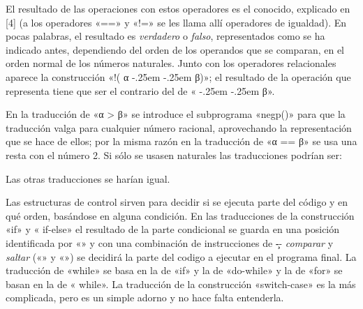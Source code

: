 El resultado de las operaciones con estos operadores es el conocido, explicado en [4] (a los
operadores «==» y «!=» se les llama allí operadores de igualdad). En pocas palabras, el resultado es
{\it verdadero} o {\it falso}, representados como se ha indicado antes, dependiendo del orden de los
operandos que se comparan, en el orden normal de los números naturales. Junto con los operadores
relacionales aparece la construcción «{\fcode!({\fgramatnoterm
α} \kern-.25em  \kern-.25em {\fgramatnoterm β})}»; el resultado de la operación
que representa tiene que ser el contrario del de «{ \kern-.25em  \kern-.25em {\fgramatnoterm β}}».

En la traducción de «{\fgramatnoterm α {\fcode >} \fgramatnoterm β}» se introduce el subprograma
«{\fcode negp()}» para que la traducción valga para cualquier número racional, aprovechando la
representación que se hace de ellos; por la misma razón en la traducción de «{\fgramatnoterm α {\fcode
==} \fgramatnoterm β}» se usa una resta con el número 2. Si sólo se usasen naturales las
traducciones podrían ser:
\listraducciones
\noindent{}\par
\noindent{}\par
\noindent{}
\finlistatrad
Las otras traducciones se harían igual.

Las estructuras de control sirven para decidir si se ejecuta parte del código y en qué orden,
basándose en alguna condición. En las traducciones de la construcción «{\fcode if}» y «{\fcode
if-else}» el resultado de la parte condicional se guarda en una posición identificada por «»
y con una combinación de instrucciones de \c-- {\it comparar} y {\it saltar} («\estrella» y «»)
se decidirá la parte del codigo a ejecutar en el programa final.  La traducción de «{\fcode while}» se
basa en la de «{\fcode if}» y la de «{\fcode do-while}» y la de «{\fcode for}» se basan en la de «{\fcode
while}». La traducción de la construcción «{\fcode switch-case}» es la más complicada, pero es un
simple adorno y no hace falta entenderla.

